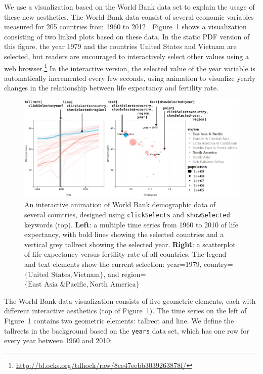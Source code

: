 \documentclass[journal]{vgtc}\usepackage[]{graphicx}\usepackage[]{color}
\begin{document}
We use a visualization based on the World Bank data set to explain
the usage of these new aesthetics. The World Bank data consist of
several economic variables measured for 205 countries from 1960 to
2012 \citep{WorldBank}. Figure~1 shows a visualization consisting of
two linked plots based on these data. In the static PDF version of
this figure, the year 1979 and the countries United States and Vietnam
are selected, but readers are encouraged to interactively select other
values using a web
browser.\footnote{\url{http://bl.ocks.org/tdhock/raw/8ce47eebb3039263878f/}}
In the interactive version, the selected value of the year variable is
automatically incremented every few seconds, using animation to
visualize yearly changes in the relationship between life expectancy
and fertility rate.

\begin{figure}[b!]
  \centering
  \includegraphics[width=\textwidth]{figure-1}
  \caption{An interactive animation of World Bank demographic data of
    several countries, designed using \texttt{clickSelects} and
    \texttt{showSelected} keywords (top).  \textbf{Left}: a multiple
    time series from 1960 to 2010 of life expectancy, with bold lines
    showing the selected countries and a vertical grey tallrect
    showing the selected year. \textbf{Right}: a scatterplot of life
    expectancy versus fertility rate of all countries. The legend and
    text elements show the current selection: year=1979,
    country=$\{\textrm{United States}, \textrm{Vietnam}\}$, and
    region=$\{\textrm{East Asia \& Pacific}, \textrm{North
      America}\}$}
  \label{fig:1}
\end{figure}

The World Bank data visualization consists of five geometric elements,
each with different interactive aesthetics (top of Figure~1). The time
series on the left of Figure~1 contains two geometric elements:
tallrect and line. We define the tallrects in the background based on
the \texttt{years} data set, which has one row for every year between
1960 and 2010:
\end{document}

